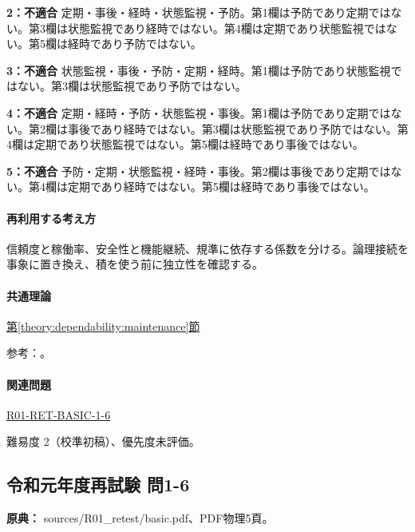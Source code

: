 \noindent\textbf{2：不適合} 定期・事後・経時・状態監視・予防。第1欄は予防であり定期ではない。第3欄は状態監視であり経時ではない。第4欄は定期であり状態監視ではない。第5欄は経時であり予防ではない。\par

\noindent\textbf{3：不適合} 状態監視・事後・予防・定期・経時。第1欄は予防であり状態監視ではない。第3欄は状態監視であり予防ではない。\par

\noindent\textbf{4：不適合} 定期・経時・予防・状態監視・事後。第1欄は予防であり定期ではない。第2欄は事後であり経時ではない。第3欄は状態監視であり予防ではない。第4欄は定期であり状態監視ではない。第5欄は経時であり事後ではない。\par

\noindent\textbf{5：不適合} 予防・定期・状態監視・経時・事後。第2欄は事後であり定期ではない。第4欄は定期であり経時ではない。第5欄は経時であり事後ではない。\par

\paragraph{再利用する考え方} 信頼度と稼働率、安全性と機能継続、規準に依存する係数を分ける。論理接続を事象に置き換え、積を使う前に独立性を確認する。

\paragraph{共通理論} \hyperref[theory:dependability:maintenance]{第\ref*{theory:dependability:maintenance}節}

\par 参考：\cite{maintenance_mlit_2013}。

\paragraph{関連問題} \hyperref[q:r01-ret-basic-1-6]{R01-RET-BASIC-1-6}

\par 難易度 2（校準初稿）、優先度未評価。

\subsection{令和元年度再試験 問1-6}
\label{q:r01-ret-basic-1-6}

\noindent\textbf{原典：} sources/R01\_retest/basic.pdf、PDF物理5頁。

